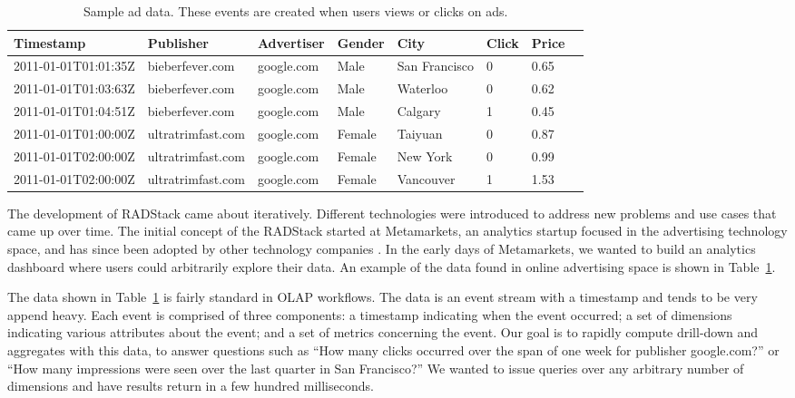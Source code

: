 \documentclass{vldb}
\begin{document}
\begin{table}
\centering
\begin{tabular}{| l | l | l | l | l | l | l | l |}
  \hline
  \textbf{Timestamp} & \textbf{Publisher} & \textbf{Advertiser} & \textbf{Gender} & \textbf{City} & \textbf{Click} & \textbf{Price} \\ \hline
  2011-01-01T01:01:35Z & bieberfever.com & google.com & Male & San Francisco & 0 & 0.65 \\ \hline
  2011-01-01T01:03:63Z & bieberfever.com & google.com & Male & Waterloo & 0 & 0.62 \\ \hline
  2011-01-01T01:04:51Z & bieberfever.com & google.com & Male & Calgary & 1 & 0.45 \\ \hline
  2011-01-01T01:00:00Z & ultratrimfast.com & google.com & Female & Taiyuan & 0 & 0.87 \\ \hline
  2011-01-01T02:00:00Z & ultratrimfast.com & google.com & Female & New York & 0 & 0.99 \\ \hline
  2011-01-01T02:00:00Z & ultratrimfast.com & google.com & Female & Vancouver & 1 & 1.53 \\ \hline
\end{tabular}
\caption{Sample ad data. These events are created when users views or clicks on ads.}
\label{tab:sample_data}
\end{table}

The development of RADStack came about iteratively. Different technologies were
introduced to address new problems and use cases that came up over time.
The initial concept of the RADStack started at Metamarkets, an analytics
startup focused in the advertising technology space, and has since been adopted
by other technology companies \cite{2014yahoo}. In the early days of Metamarkets, we wanted
to build an analytics dashboard where users could arbitrarily explore their
data. An example of the data found in online advertising space is shown in
Table~\ref{tab:sample_data}. 

The data shown in Table~\ref{tab:sample_data} is fairly standard in OLAP
workflows. The data is an event stream with a timestamp and tends to be very
append heavy. Each event is comprised of three components: a timestamp
indicating when the event occurred; a set of dimensions indicating various
attributes about the event; and a set of metrics concerning the event. Our goal
is to rapidly compute drill-down and aggregates with this data, to answer
questions such as “How many clicks occurred over the span of one week for
publisher google.com?” or “How many impressions were seen over the last quarter
in San Francisco?” We wanted to issue queries over any arbitrary
number of dimensions and have results return in a few hundred
milliseconds.
\end{document}
